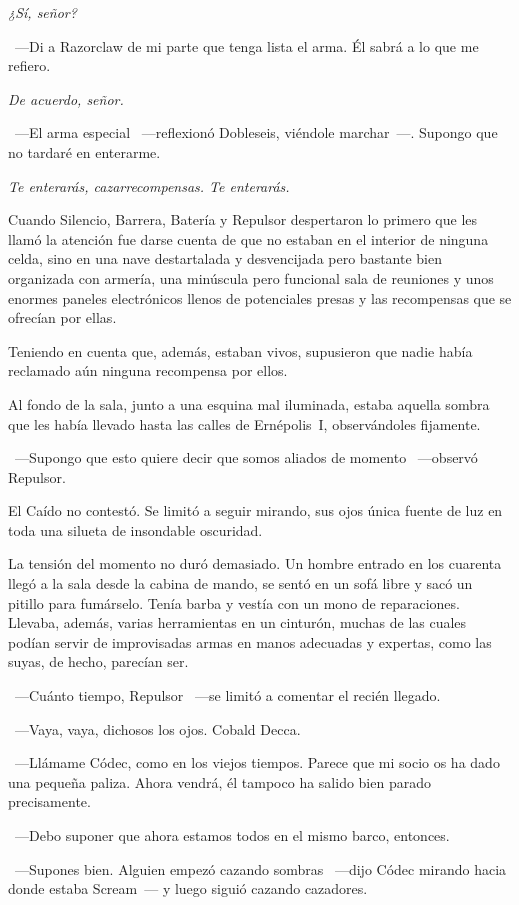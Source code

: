 \emph{¿Sí, señor?}

~---Di a Razorclaw de mi parte que tenga lista el arma. Él sabrá a lo que me refiero.

\emph{De acuerdo, señor.}

~---El arma especial ~---reflexionó Dobleseis, viéndole marchar~---. Supongo que no tardaré en enterarme.

\emph{Te enterarás, cazarrecompensas. Te enterarás.}

\parbreak
Cuando Silencio, Barrera, Batería y Repulsor despertaron lo primero que les llamó la atención fue darse cuenta de que no estaban en el interior de ninguna celda, sino en una nave destartalada y desvencijada pero bastante bien organizada con armería, una minúscula pero funcional sala de reuniones y unos enormes paneles electrónicos llenos de potenciales presas y las recompensas que se ofrecían por ellas.

Teniendo en cuenta que, además, estaban vivos, supusieron que nadie había reclamado aún ninguna recompensa por ellos.

Al fondo de la sala, junto a una esquina mal iluminada, estaba aquella sombra que les había llevado hasta las calles de Ernépolis~I, observándoles fijamente.

~---Supongo que esto quiere decir que somos aliados de momento ~---observó Repulsor.

El Caído no contestó. Se limitó a seguir mirando, sus ojos única fuente de luz en toda una silueta de insondable oscuridad.

La tensión del momento no duró demasiado. Un hombre entrado en los cuarenta llegó a la sala desde la cabina de mando, se sentó en un sofá libre y sacó un pitillo para fumárselo. Tenía barba y vestía con un mono de reparaciones. Llevaba, además, varias herramientas en un cinturón, muchas de las cuales podían servir de improvisadas armas en manos adecuadas y expertas, como las suyas, de hecho, parecían ser.

~---Cuánto tiempo, Repulsor ~---se limitó a comentar el recién llegado.

~---Vaya, vaya, dichosos los ojos. Cobald Decca.

~---Llámame Códec, como en los viejos tiempos. Parece que mi socio os ha dado una pequeña paliza. Ahora vendrá, él tampoco ha salido bien parado precisamente.

~---Debo suponer que ahora estamos todos en el mismo barco, entonces.

~---Supones bien. Alguien empezó cazando sombras ~---dijo Códec mirando hacia donde estaba Scream~--- y luego siguió cazando cazadores.

